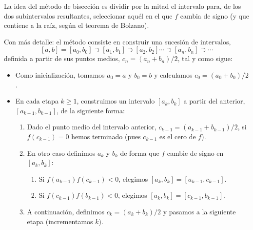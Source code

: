 La idea del método de bisección es dividir por la mitad el intervalo
para, de los dos subintervalos resultantes, seleccionar aquél en el
que $f$ cambia de signo (y que contiene a la raíz, según el teorema de
Bolzano).

Con más detalle: el método consiste en construir una sucesión de
intervalos,
\begin{equation}
\label{eq:tema1:bisecc:0}
[a,b]=[a_0,b_0] \supset [a_1,b_1] \supset [a_2,b_2] \cdots \supset
[a_n,b_n] \supset \cdots
\end{equation}
definida a partir de sus puntos medios, $c_n=(a_n+b_n)/2$, tal y como sigue:
\begin{itemize}
\item Como inicialización, tomamos $a_0=a$ y $b_0=b$ y calculamos
  $c_0=(a_0+b_0)/2$.
\item En cada etapa $k\ge 1$, construimos un intervalo $[a_k,b_k]$ a
  partir del anterior, $[a_{k-1}, b_{k-1}]$, de la siguiente forma:
  \begin{enumerate}
  \item Dado el punto medio del intervalo anterior,
    $c_{k-1}=(a_{k-1}+b_{k-1})/2$, si $f(c_{k-1})=0$ hemos terminado
    (pues $c_{k-1}$ es el cero de $f$).
  \item En otro caso definimos $a_k$ y $b_k$ de forma que $f$ cambie de
    signo en $[a_k,b_k]$:
    \begin{enumerate}
    \item Si $f(a_{k-1})f(c_{k-1})<0$, elegimos $[a_k,b_k]=[a_{k-1}, c_{k-1}]$.
    \item Si $f(c_{k-1})f(b_{k-1})<0$, elegimos $[a_k,b_k]=[c_{k-1}, b_{k-1}]$.
    \end{enumerate}
  \item A continuación, definimos $c_k=(a_k+b_k)/2$ y pasamos a la
    siguiente etapa (incrementamos $k$).
  \end{enumerate}
\end{itemize}

